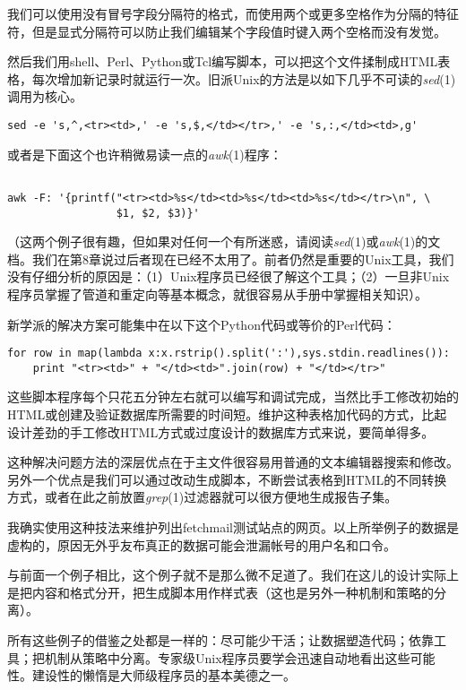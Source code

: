 \documentclass[12pt,oneside]{book}
\begin{document}
\begin{common-format}
我们可以使用没有冒号字段分隔符的格式，而使用两个或更多空格作为分隔的特征符，但是显式分隔符可以防止我们编辑某个字段值时键入两个空格而没有发觉。

然后我们用shell、Perl、Python或Tcl编写脚本，可以把这个文件揉制成HTML表格，每次增加新记录时就运行一次。旧派Unix的方法是以如下几乎不可读的\textit{sed}(1)调用为核心。

\begin{Verbatim}
sed -e 's,^,<tr><td>,' -e 's,$,</td></tr>,' -e 's,:,</td><td>,g'
\end{Verbatim}

或者是下面这个也许稍微易读一点的\textit{awk}(1)程序：
\begin{Verbatim}

awk -F: '{printf("<tr><td>%s</td><td>%s</td><td>%s</td></tr>\n", \
                 $1, $2, $3)}'
\end{Verbatim}

（这两个例子很有趣，但如果对任何一个有所迷惑，请阅读\textit{sed}(1)或\textit{awk}(1)的文档。我们在第8章说过后者现在已经不太用了。前者仍然是重要的Unix工具，我们没有仔细分析的原因是：（1）Unix程序员已经很了解这个工具；（2）一旦非Unix程序员掌握了管道和重定向等基本概念，就很容易从手册中掌握相关知识）。

新学派的解决方案可能集中在以下这个Python代码或等价的Perl代码：
\begin{Verbatim}
for row in map(lambda x:x.rstrip().split(':'),sys.stdin.readlines()):
    print "<tr><td>" + "</td><td>".join(row) + "</td></tr>"
\end{Verbatim}

这些脚本程序每个只花五分钟左右就可以编写和调试完成，当然比手工修改初始的HTML或创建及验证数据库所需要的时间短。维护这种表格加代码的方式，比起设计差劲的手工修改HTML方式或过度设计的数据库方式来说，要简单得多。

这种解决问题方法的深层优点在于主文件很容易用普通的文本编辑器搜索和修改。另外一个优点是我们可以通过改动生成脚本，不断尝试表格到HTML的不同转换方式，或者在此之前放置\textit{grep}(1)过滤器就可以很方便地生成报告子集。

我确实使用这种技法来维护列出fetchmail测试站点的网页。以上所举例子的数据是虚构的，原因无外乎友布真正的数据可能会泄漏帐号的用户名和口令。

与前面一个例子相比，这个例子就不是那么微不足道了。我们在这儿的设计实际上是把内容和格式分开，把生成脚本用作样式表（这也是另外一种机制和策略的分离）。

所有这些例子的借鉴之处都是一样的：尽可能少干活；让数据塑造代码；依靠工具；把机制从策略中分离。专家级Unix程序员要学会迅速自动地看出这些可能性。建设性的懒惰是大师级程序员的基本美德之一。




\end{common-format}
\end{document}
